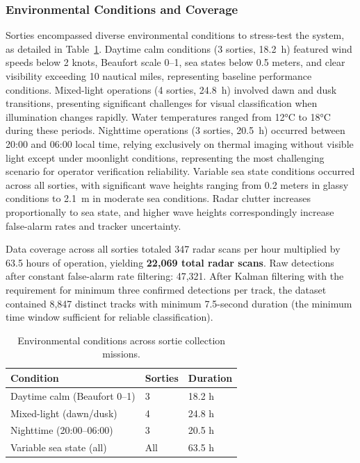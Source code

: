 \documentclass[twocolumn, 10pt]{article}
\begin{document}
\subsubsection{Environmental Conditions and Coverage}

Sorties encompassed diverse environmental conditions to stress-test the system, as detailed in Table~\ref{tab:environmental_conditions}. Daytime calm conditions (3 sorties, \SI{18.2}{h}) featured wind speeds below 2 knots, Beaufort scale 0--1, sea states below 0.5 meters, and clear visibility exceeding 10 nautical miles, representing baseline performance conditions. Mixed-light operations (4 sorties, \SI{24.8}{h}) involved dawn and dusk transitions, presenting significant challenges for visual classification when illumination changes rapidly. Water temperatures ranged from 12°C to 18°C during these periods. Nighttime operations (3 sorties, \SI{20.5}{h}) occurred between 20:00 and 06:00 local time, relying exclusively on thermal imaging without visible light except under moonlight conditions, representing the most challenging scenario for operator verification reliability. Variable sea state conditions occurred across all sorties, with significant wave heights ranging from 0.2 meters in glassy conditions to \SI{2.1}{m} in moderate sea conditions. Radar clutter increases proportionally to sea state, and higher wave heights correspondingly increase false-alarm rates and tracker uncertainty.

Data coverage across all sorties totaled 347 radar scans per hour multiplied by 63.5 hours of operation, yielding \textbf{22,069 total radar scans}. Raw detections after constant false-alarm rate filtering: 47,321. After Kalman filtering with the requirement for minimum three confirmed detections per track, the dataset contained 8,847 distinct tracks with minimum 7.5-second duration (the minimum time window sufficient for reliable classification).

\begin{table}[t]
\caption{Environmental conditions across sortie collection missions.}
\label{tab:environmental_conditions}
\centering
\small
\begin{tabular}{@{}lll@{}}
\toprule
Condition & Sorties & Duration \\
\midrule
Daytime calm (Beaufort 0--1) & 3 & 18.2 h \\
Mixed-light (dawn/dusk) & 4 & 24.8 h \\
Nighttime (20:00--06:00) & 3 & 20.5 h \\
Variable sea state (all) & All & 63.5 h \\
\bottomrule
\end{tabular}
\end{table}
\end{document}
